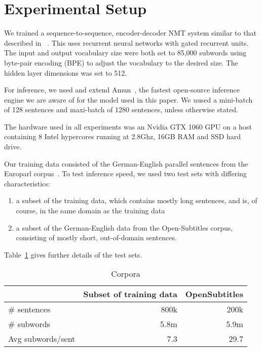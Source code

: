 \documentclass[]{article}
\begin{document}
\section{Experimental Setup}
\label{sec:Experimental Setup}

We trained a sequence-to-sequence, encoder-decoder NMT system similar to that described in ~\cite{sennrich-haddow-birch:2016:P16-12}. This uses recurrent neural networks with gated recurrent units. The input and output vocabulary size were both set to 85,000 subwords using byte-pair encoding (BPE) to adjust the vocabulary to the desired size. The hidden layer dimensions was set to 512. %

For inference, we used and extend Amun~\citep{junczys2016neural}, the fastest open-source inference engine we are aware of for the model used in this paper. We uused a mini-batch of 128 sentences and maxi-batch of 1280 sentences, unless otherwise stated.

The hardware used in all experiments was an Nvidia GTX 1060 GPU on a host containing 8 Intel hypercores running at 2.8Ghz, 16GB RAM and SSD hard drive.

Our training data consisted of the German-English parallel sentences from the Europarl corpus~\citep{Koehn:2005:MTS}. To test inference speed, we used two test sets with differing characteristics:
\begin{enumerate}
   \item \vspace{-2 mm} a subset of the training data, which contains mostly long sentences, and is, of course, in the same domain as the training data
   \item \vspace{-2 mm} a subset of the German-English data from the Open-Subtitles corpus, consisting of mostly short, out-of-domain sentences.
\end{enumerate}
Table~\ref{tab:corpora} gives further details of the test sets.

\begin{table}
\begin{center}
\small
\begin{tabular}{|l|r|r|} \hline
		& Subset of training data		& OpenSubtitles \\ \hline
\# sentences  	& 800k 		& 200k \\
\# subwords 	& 5.8m 		& 5.9m \\ 
Avg subwords/sent	& 7.3		& 29.7 \\ \hline
\end{tabular}
\end{center}
\caption{Corpora}
\label{tab:corpora}
\end{table}
\end{document}
